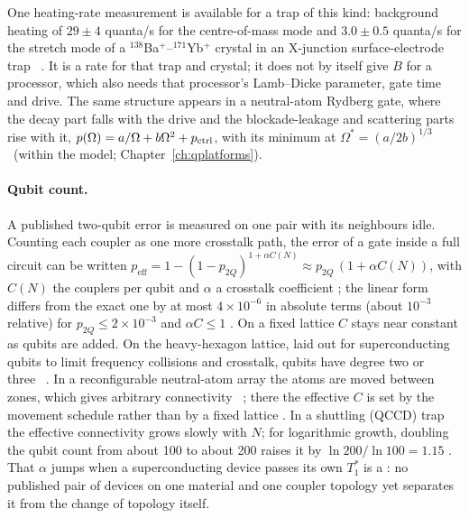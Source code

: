 \noindent One heating-rate measurement is available for a trap of this kind: background heating of $29\pm4$ quanta/s for the centre-of-mass mode and
$3.0\pm0.5$ quanta/s for the stretch mode of a $^{138}$Ba$^+$--$^{171}$Yb$^+$ crystal in an X-junction surface-electrode trap~\cite{Burton2023}
\observed. It is a rate for that trap and crystal; it does not by itself give $B$ for a processor, which also needs that processor's Lamb--Dicke
parameter, gate time and drive. The same structure appears in a neutral-atom Rydberg gate, where the decay part falls with the drive and the
blockade-leakage and scattering parts rise with it, $p(\Omega)=a/\Omega+b\Omega^2+p_{\rm ctrl}$, with its minimum at $\Omega^*=(a/2b)^{1/3}$
\derived\ (within the model; Chapter~\ref{ch:qplatforms}).

\paragraph{Qubit count.} A published two-qubit error is measured on one pair with its neighbours idle. Counting each coupler as one more
crosstalk path, the error of a gate inside a full circuit can be written $p_{\mathrm{eff}}=1-(1-p_{2Q})^{1+\alpha C(N)}\approx
p_{2Q}\,(1+\alpha C(N))$, with $C(N)$ the couplers per qubit and $\alpha$ a crosstalk coefficient \conjecture; the linear form differs from the exact one
by at most $4\times10^{-6}$ in absolute terms (about $10^{-3}$ relative) for $p_{2Q}\le2\times10^{-3}$ and $\alpha C\le1$ \calc. On a fixed lattice $C$ stays near constant as qubits
are added. On the heavy-hexagon lattice, laid out for superconducting qubits to limit frequency collisions and crosstalk, qubits have degree two
or three~\cite{Chamberland2020PRX} \observed. In a reconfigurable neutral-atom array the atoms are moved between zones, which gives
arbitrary connectivity~\cite{Bluvstein2024} \observed; there the effective $C$ is set by the movement schedule rather than by a fixed
lattice \interp. In a shuttling (QCCD) trap the effective connectivity grows slowly with $N$; for logarithmic growth, doubling the qubit count from
about 100 to about 200 raises it by $\ln200/\ln100=1.15$ \calc. That $\alpha$ jumps when a superconducting device passes its own $T_1^*$ is a
\conjecture: no published pair of devices on one material and one coupler topology yet separates it from the change of topology itself.

